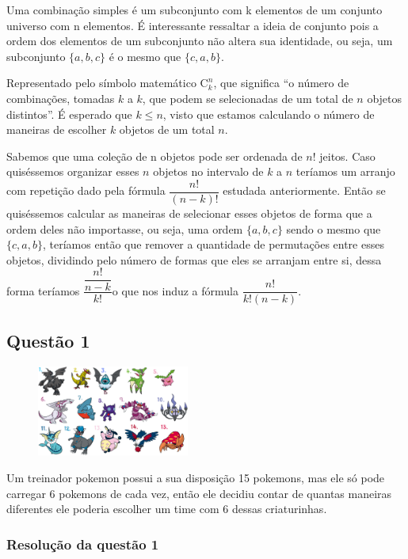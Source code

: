 Uma combinação simples é um subconjunto com k elementos de um conjunto universo com n elementos. É interessante ressaltar a ideia de conjunto pois a ordem dos elementos de um subconjunto não altera sua identidade, ou seja, um subconjunto $\{a, b, c\}$ é o mesmo que $\{c , a, b\}$.

Representado pelo símbolo matemático $\mathrm{C}_k^n$, que significa ``o número de combinações, tomadas $k$ a $k$, que podem se selecionadas de um total de $n$ objetos distintos''.  É esperado que $k \leq n$, visto que estamos calculando o número de maneiras de escolher $k$ objetos de um total $n$.

Sabemos que uma coleção de n objetos pode ser ordenada de $n!$ jeitos. Caso quiséssemos organizar esses $n$ objetos no intervalo de $k$ a $n$ teríamos um arranjo com repetição dado pela fórmula $ \dfrac{n!}{(n - k)!}$ estudada anteriormente. Então se quiséssemos calcular as maneiras de selecionar esses objetos de forma que a ordem deles não importasse, ou seja, uma ordem $\{a, b, c\}$ sendo o mesmo que $\{c , a, b\}$, teríamos então que remover a quantidade de permutações entre esses objetos, dividindo pelo número de formas que eles se arranjam entre si, dessa forma teríamos $\dfrac{\dfrac{n!}{n-k}}{k!}$o que nos induz a fórmula $\dfrac{n!}{k!(n-k)}$.

\subsection*{Questão 1}

\begin{figure}
	\includegraphics[width=5cm, left]{imagens/pokemon.png}
\end{figure}

Um treinador pokemon possui a sua disposição 15 pokemons, mas ele só pode carregar 6 pokemons de cada vez, então ele decidiu contar de quantas maneiras diferentes ele poderia escolher um time com 6 dessas criaturinhas.

\subsubsection*{Resolução da questão 1}

